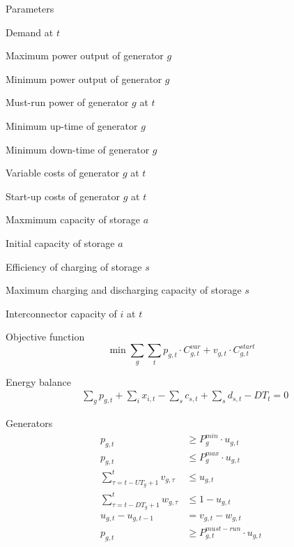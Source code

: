 \documentclass[a4paper,11pt]{article}
\begin{document}
\begin{multicols}{2}
\noindent Parameters
\begin{description}[leftmargin=!,labelwidth=40pt,labelindent=10pt]
\item[$DT_{t}$]             Demand at $t$
\item[$P_g^{max}$]          Maximum power output of generator $g$
\item[$P_g^{min}$]          Minimum power output of generator $g$
\item[$P_{g,t}^{must-run}$] Must-run power of generator $g$ at $t$
\item[$UT_g$]               Minimum up-time of generator $g$
\item[$DT_g$]               Minimum down-time of generator $g$
\item[$C_{g,t}^{var}$]      Variable costs of generator $g$ at $t$
\item[$C_{g,t}^{start}$]    Start-up costs of generator $g$ at $t$
\item[$S_{s}^{max}$]        Maxmimum capacity of storage $a$
\item[$S_{s}^{ini}$]        Initial capacity of storage $a$
\item[$\etaup_{s}$]         Efficiency of charging of storage $s$
\item[$K_{s}$]              Maximum charging and discharging capacity of storage $s$
\item[$X_{i,t}$]              Interconnector capacity of $i$ at $t$
\end{description}

\columnbreak



Objective function
\begin{subequations}
\begin{equation}
\!\min \sum_g \sum_t p_{g,t} \cdot C_{g,t}^{var} + v_{g,t} \cdot C_{g,t}^{start} \label{eq:optProb}
\end{equation}
\end{subequations}

Energy balance
\begin{subequations}
\begin{align}
&\sum_g p_{g,t} + \sum_i x_{i,t} - \sum_s c_{s,t} + \sum_s d_{s,t} - DT_{t} =  0 \label{eq:balance}
\end{align}
\end{subequations}

Generators
\begin{subequations}
\begin{align}
p_{g,t} &\geq P_g^{min} \cdot u_{g,t}\label{eq:p_min}\\
p_{g,t} &\leq P_g^{max} \cdot u_{g,t}\label{eq:p_max}\\
\sum_{\tau=t-UT_g +1}^t v_{g,\tau} &\leq u_{g,t}\label{eq:min_up_time}\\
\sum_{\tau=t-DT_g +1}^t w_{g,\tau} &\leq 1 - u_{g,t} \label{eq:min_dn_time}\\
u_{g,t} - u_{g,t-1} &= v_{g,t} - w_{g,t} \label{eq:on_off}\\
p_{g,t} &\geq P_{g,t}^{must-run} \cdot u_{g,t} \label{eq:must_run}
\end{align}
\end{subequations}


\end{multicols}
\end{document}
